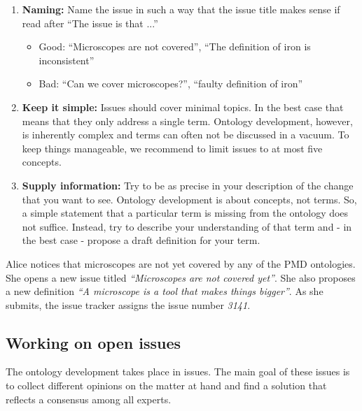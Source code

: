 \begin{enumerate}
    \item \textbf{Naming:} Name the issue in such a way that the issue title makes sense if read after ``The issue is that ...''
    \begin{itemize}
        \item Good: ``Microscopes are not covered'', ``The definition of iron is inconsistent''
        \item Bad: ``Can we cover microscopes?'', ``faulty definition of iron''
    \end{itemize}
    \item \textbf{Keep it simple:} Issues should cover minimal topics. In the best case that means that they only address a single term. Ontology development, however, is inherently complex and terms can often not be discussed in a vacuum. To keep things manageable, we recommend to limit issues to at most five concepts.
    \item \textbf{Supply information:} Try to be as precise in your description of the change that you want to see. Ontology development is about concepts, not terms. So, a simple statement that a particular term is missing from the ontology does not suffice. Instead, try to describe your understanding of that term and - in the best case - propose a draft definition for your term. 
\end{enumerate}

\begin{example}
    Alice notices that microscopes are not yet covered by any of the PMD ontologies. She opens a new issue titled \textit{``Microscopes are not covered yet''}. She also proposes a new definition \textit{``A microscope is a tool that makes things bigger''}. As she submits, the issue tracker assigns the issue number \textit{3141}.
\end{example}

\subsection{Working on open issues}

The ontology development takes place in {\github} issues. The main goal of these issues is to collect different opinions on the matter at hand and find a solution that reflects a consensus among all experts.

